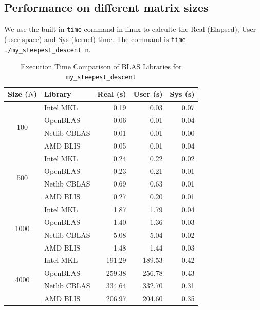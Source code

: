 \documentclass[12pt]{article}
\theoremstyle{definition}
\theoremstyle{remark}
\begin{document}
\subsection{Performance on different matrix sizes}
We use the built-in \texttt{time} command in linux to calculte the Real (Elapsed), User (user space) and Sys (kernel) time. The command is \texttt{time ./my\_steepest\_descent n}.
\begin{table}[H]
    \centering
    \vspace{0.5em}
    \begin{tabular}{clrrr}
        \toprule
        \textbf{Size ($N$)} & \textbf{Library} & \textbf{Real (s)} & \textbf{User (s)} & \textbf{Sys (s)} \\
        \midrule
        \multirow{4}{*}{100} 
        & Intel MKL & 0.19 & 0.03 & 0.07 \\
        & OpenBLAS & 0.06 & 0.01 & 0.04 \\
        & Netlib CBLAS & 0.01 & 0.01 & 0.00 \\
        & AMD BLIS & 0.05 & 0.01 & 0.04 \\
        \midrule
        \multirow{4}{*}{500} 
        & Intel MKL & 0.24 & 0.22 & 0.02 \\
        & OpenBLAS & 0.23 & 0.21 & 0.01 \\
        & Netlib CBLAS & 0.69 & 0.63 & 0.01 \\
        & AMD BLIS & 0.27 & 0.20 & 0.01 \\
        \midrule
        \multirow{4}{*}{1000} 
        & Intel MKL & 1.87 & 1.79 & 0.04 \\
        & OpenBLAS & 1.40 & 1.36 & 0.03 \\
        & Netlib CBLAS & 5.08 & 5.04 & 0.02 \\
        & AMD BLIS & 1.48 & 1.44 & 0.03 \\
        \midrule
        \multirow{4}{*}{4000} 
        & Intel MKL & 191.29 & 189.53 & 0.42 \\
        & OpenBLAS & 259.38 & 256.78 & 0.43 \\
        & Netlib CBLAS & 334.64 & 332.70 & 0.31 \\
        & AMD BLIS & 206.97 & 204.60 & 0.35 \\
        \bottomrule
    \end{tabular}
    \caption{Execution Time Comparison of BLAS Libraries for \texttt{my\_steepest\_descent}}
    \label{tab:blas_comparison}
\end{table}
\end{document}
